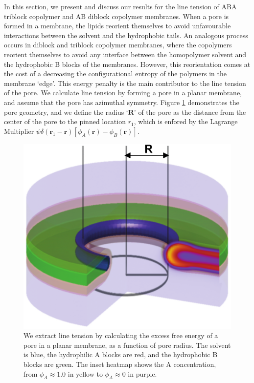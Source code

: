 \documentclass[twocolumn,aps,floatfix,nobibnotes]{revtex4-1}
\begin{document}
In this section, we present and discuss our results for the line tension of ABA triblock copolymer and AB diblock copolymer membranes. When a pore is formed in a membrane, the lipids reorient themselves to avoid unfavourable interactions between the solvent and the hydrophobic tails. An analogous process occurs in diblock and triblock copolymer membranes, where the copolymers reorient themselves to avoid any interface between the homopolymer solvent and the hydrophobic B blocks of the membranes. However, this reorientation comes at the cost of a decreasing the configurational entropy of the polymers in the membrane `edge'. This energy penalty is the main contributor to the line tension of the pore. We calculate line tension by forming a pore in a planar membrane, and assume that the pore has azimuthal symmetry. Figure \ref{fig:Pore} demonstrates the pore geometry, and we define the radius `$\textbf{R}$' of the pore as the distance from the center of the pore to the pinned location $r_1$, which is enfored by the Lagrange Multiplier $\psi \delta (\textbf{r}_1 - \textbf{r})[\phi_A(\textbf{r}) - \phi_B(\textbf{r})]$. 

\begin{figure}[htp]
\centering
\includegraphics[width=1.0\columnwidth]{Pore.eps}
\caption{We extract line tension by calculating the excess free energy of a pore in a planar membrane, as a function of pore radius. The solvent is blue, the hydrophilic A blocks are red, and the hydrophobic B blocks are green. The inset heatmap shows the A concentration, from  $\phi_A \approx 1.0$ in yellow to $\phi_A \approx 0$ in purple.}
\label{fig:Pore}
\centering
\end{figure}
\end{document}
